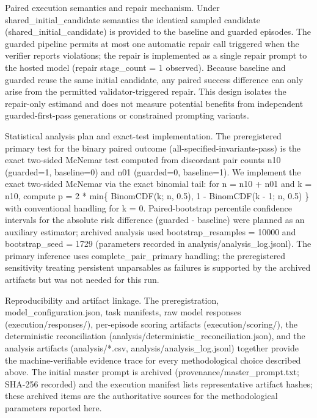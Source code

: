 \documentclass[conference]{IEEEtran}
\begin{document}
Paired execution semantics and repair mechanism. Under shared\_initial\_candidate semantics the identical sampled candidate (shared\_initial\_candidate) is provided to the baseline and guarded episodes. The guarded pipeline permits at most one automatic repair call triggered when the verifier reports violations; the repair is implemented as a single repair prompt to the hosted model (repair stage\_count = 1 observed). Because baseline and guarded reuse the same initial candidate, any paired success difference can only arise from the permitted validator-triggered repair. This design isolates the repair-only estimand and does not measure potential benefits from independent guarded-first-pass generations or constrained prompting variants.

Statistical analysis plan and exact-test implementation. The preregistered primary test for the binary paired outcome (all-specified-invariants-pass) is the exact two-sided McNemar test computed from discordant pair counts n10 (guarded=1, baseline=0) and n01 (guarded=0, baseline=1). We implement the exact two-sided McNemar via the exact binomial tail: for n = n10 + n01 and k = n10, compute p = 2 * min\{ BinomCDF(k; n, 0.5), 1 - BinomCDF(k - 1; n, 0.5) \} with conventional handling for k = 0. Paired-bootstrap percentile confidence intervals for the absolute risk difference (guarded - baseline) were planned as an auxiliary estimator; archived analysis used bootstrap\_resamples = 10000 and bootstrap\_seed = 1729 (parameters recorded in analysis/analysis\_log.jsonl). The primary inference uses complete\_pair\_primary handling; the preregistered sensitivity treating persistent unparsables as failures is supported by the archived artifacts but was not needed for this run.

Reproducibility and artifact linkage. The preregistration, model\_configuration.json, task manifests, raw model responses (execution/responses/), per-episode scoring artifacts (execution/scoring/), the deterministic reconciliation (analysis/deterministic\_reconciliation.json), and the analysis artifacts (analysis/*.csv, analysis/analysis\_log.jsonl) together provide the machine-verifiable evidence trace for every methodological choice described above. The initial master prompt is archived (provenance/master\_prompt.txt; SHA-256 recorded) and the execution manifest lists representative artifact hashes; these archived items are the authoritative sources for the methodological parameters reported here.
\end{document}
